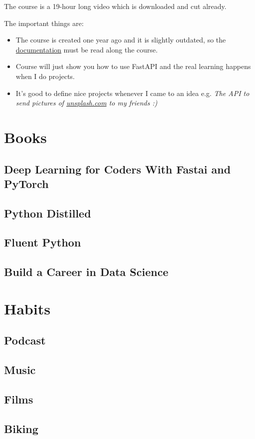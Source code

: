 \documentclass[12pt]{article}
\begin{document}
			The course is a 19-hour long video which is downloaded and cut already. 
			
			The important things are:
			\begin{itemize}
				\item The course is created one year ago and it is slightly outdated, so the \href{fastapi.tiangolo.com}{documentation} must be read along the course.
				
				\item Course will just show you how to use FastAPI and the real learning happens when I do projects.
				
				\item It's good to define nice projects whenever I came to an idea
				e.g. \textit{The API to send pictures of \url{unsplash.com} to my friends :)}
			\end{itemize}
	
	\section{Books}
		\subsection{Deep Learning for Coders With Fastai and PyTorch}
		\subsection{Python Distilled}
		\subsection{Fluent Python}
		\subsection{Build a Career in Data Science}
		
	\section{Habits}
		\subsection{Podcast}
		\subsection{Music}
		\subsection{Films}
		\subsection{Biking}
	
\end{document}
